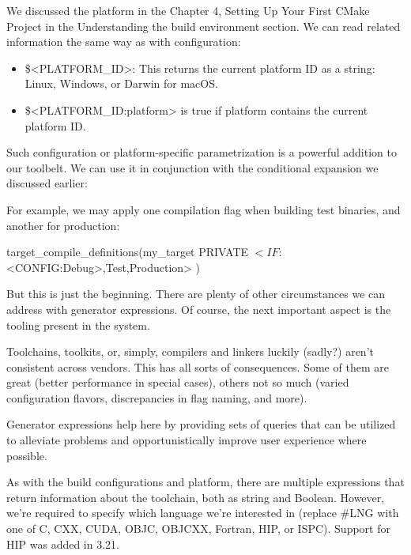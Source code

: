 We discussed the platform in the Chapter 4, Setting Up Your First CMake Project in the Understanding the build environment section. We can read related information the same way as with configuration:

\begin{itemize}
\item
\$<PLATFORM\_ID>: This returns the current platform ID as a string: Linux, Windows, or Darwin for macOS.

\item
\$<PLATFORM\_ID:platform> is true if platform contains the current platform ID.
\end{itemize}

Such configuration or platform-specific parametrization is a powerful addition to our toolbelt. We can use it in conjunction with the conditional expansion we discussed earlier:


For example, we may apply one compilation flag when building test binaries, and another for production:

\begin{cmake}
target_compile_definitions(my_target PRIVATE
    $<IF:$<CONFIG:Debug>,Test,Production>
)
\end{cmake}

But this is just the beginning. There are plenty of other circumstances we can address with generator expressions. Of course, the next important aspect is the tooling present in the system.


Toolchains, toolkits, or, simply, compilers and linkers luckily (sadly?) aren’t consistent across vendors. This has all sorts of consequences. Some of them are great (better performance in special cases), others not so much (varied configuration flavors, discrepancies in flag naming, and more).

Generator expressions help here by providing sets of queries that can be utilized to alleviate problems and opportunistically improve user experience where possible.

As with the build configurations and platform, there are multiple expressions that return information about the toolchain, both as string and Boolean. However, we’re required to specify which language we’re interested in (replace \#LNG with one of C, CXX, CUDA, OBJC, OBJCXX, Fortran, HIP, or ISPC). Support for HIP was added in 3.21.

